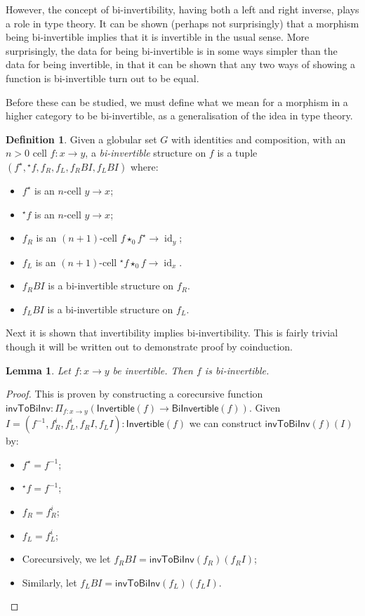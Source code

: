 \documentclass{article}
\newtheorem{lemma}{Lemma}
\theoremstyle{definition}
\newtheorem{definition}{Definition}
\theoremstyle{remark}
\DeclareMathOperator{\id}{id}
\newcommand{\linv}[1]{{}^\star\!#1}
\newcommand{\rinv}[1]{#1^\star}
\newcommand{\inv}[1]{#1^{-1}}
\newcommand{\comp}{\star}
\begin{document}
However, the concept of bi-invertibility, having both a left and right inverse, plays a role in type theory. It can be shown (perhaps not surprisingly) that a morphism being bi-invertible implies that it is invertible in the usual sense. More surprisingly, the data for being bi-invertible is in some ways simpler than the data for being invertible, in that it can be shown that any two ways of showing a function is bi-invertible turn out to be equal.

Before these can be studied, we must define what we mean for a morphism in a higher category to be bi-invertible, as a generalisation of the idea in type theory.

\begin{definition}
  Given a globular set \(G\) with identities and composition, with an \(n > 0\) cell \(f : x \to y\), a \emph{bi-invertible} structure on \(f\) is a tuple \((\rinv f, \linv f, f_R, f_L, f_R{}BI, f_L{}BI)\) where:
  \begin{itemize}
  \item \(\rinv f\) is an \(n\)-cell \(y \to x\);
  \item \(\linv f\) is an \(n\)-cell \(y \to x\);
  \item \(f_R\) is an \((n+1)\)-cell \(f \comp_0 \rinv f \to \id_y\);
  \item \(f_L\) is an \((n+1)\)-cell \(\linv f \comp_0 f \to \id_x\).
  \item \(f_R{}BI\) is a bi-invertible structure on \(f_R\).
  \item \(f_L{}BI\) is a bi-invertible structure on \(f_L\).
  \end{itemize}
\end{definition}

Next it is shown that invertibility implies bi-invertibility. This is fairly trivial though it will be written out to demonstrate proof by coinduction.

\begin{lemma}\label{inv-to-bi-inv}
  Let \(f : x \to y\) be invertible. Then \(f\) is bi-invertible.
\end{lemma}

\begin{proof}
  This is proven by constructing a corecursive function \(\mathsf{invToBiInv} : \Pi_{f : x \to y} (\mathsf{Invertible}(f) \to \mathsf{BiInvertible}(f))\). Given \(I = (\inv f,f_R^i,f_L^i,f_R{}I, f_L{}I) : \mathsf{Invertible}(f)\) we can construct \(\mathsf{invToBiInv}(f)(I)\) by:
  \begin{itemize}
  \item \(\rinv f = \inv f\);
  \item \(\linv f = \inv f\);
  \item \(f_R = f_R^i\);
  \item \(f_L = f_L^i\);
  \item Corecursively, we let \(f_R{}BI = \mathsf{invToBiInv}(f_R)(f_R{}I)\);
  \item Similarly, let \(f_L{}BI = \mathsf{invToBiInv}(f_L)(f_L{}I)\).
  \end{itemize}
\end{proof}
\end{document}
